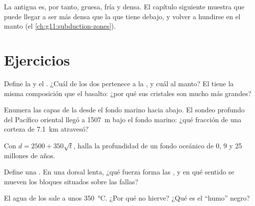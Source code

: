 La  antigua es, por tanto, gruesa, fría y densa. El
capítulo siguiente muestra que puede llegar a ser más densa que la 
que tiene debajo, y volver a hundirse en el manto (el \cref{ch:g11:subduction-zones}).

\section{Ejercicios}

\begin{exercise}[$\star$]\label{exo:g11:ocean-ridges:1}
Define la  y el . ¿Cuál de los dos pertenece a la , y cuál al manto? El  tiene la misma composición que el
basalto: ¿por qué sus cristales son mucho más grandes?
\end{exercise}

\begin{exercise}[$\star$]\label{exo:g11:ocean-ridges:2}
Enumera las capas de la  desde el fondo marino hacia abajo.
El sondeo profundo del Pacífico oriental llegó a \qty{1507}{m} bajo el fondo
marino: ¿qué fracción de una corteza de \qty{7.1}{km} atravesó?
\end{exercise}

\begin{exercise}[$\star$]\label{exo:g11:ocean-ridges:3}
Con $d = 2500 + 350\sqrt{t}$, halla la profundidad de un fondo oceánico de 0,
9 y 25 millones de años.
\end{exercise}

\begin{exercise}[$\star$]\label{exo:g11:ocean-ridges:4}
Define una . En una dorsal lenta, ¿qué fuerza forma las , y en qué sentido se mueven los bloques situados sobre las fallas?
\end{exercise}

\begin{exercise}[$\star$]\label{exo:g11:ocean-ridges:5}
El agua de los  sale a unos \qty{350}{\celsius}. ¿Por qué no
hierve? ¿Qué es el ``humo'' negro?
\end{exercise}


